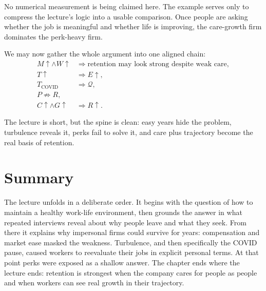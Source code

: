 No numerical measurement is being claimed here. The example serves only to compress the lecture's logic into a usable comparison. Once people are asking whether the job is meaningful and whether life is improving, the care-growth firm dominates the perk-heavy firm.

We may now gather the whole argument into one aligned chain:
\begin{align}
M \uparrow \land W \uparrow &\Rightarrow \text{retention may look strong despite weak care},\\
T \uparrow &\Rightarrow E \uparrow,\\
T_{\text{COVID}} &\Rightarrow \mathcal{Q},\\
P \not\Rightarrow R,\\
C \uparrow \land G \uparrow &\Rightarrow R \uparrow .
\end{align}

The lecture is short, but the spine is clean: easy years hide the problem, turbulence reveals it, perks fail to solve it, and care plus trajectory become the real basis of retention.

\section{Summary}

The lecture unfolds in a deliberate order. It begins with the question of how to maintain a healthy work-life environment, then grounds the answer in what repeated interviews reveal about why people leave and what they seek. From there it explains why impersonal firms could survive for years: compensation and market ease masked the weakness. Turbulence, and then specifically the COVID pause, caused workers to reevaluate their jobs in explicit personal terms. At that point perks were exposed as a shallow answer. The chapter ends where the lecture ends: retention is strongest when the company cares for people as people and when workers can see real growth in their trajectory.